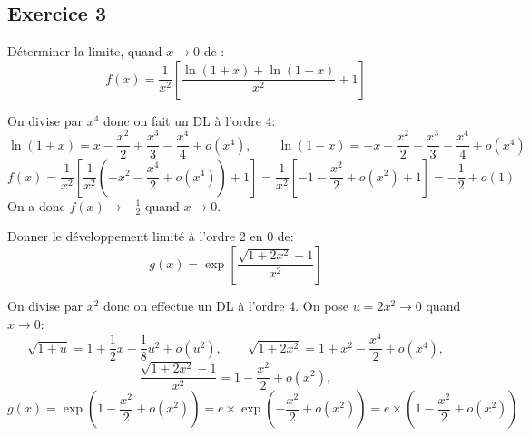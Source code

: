 \documentclass{article}[11pt]
\begin{document}
\subsection*{Exercice 3}
\begin{enumerate}
{\color{blue}
\item Déterminer la limite, quand $x\to 0$ de :
\[f(x)=\frac{1}{x^2}\left[\frac{\ln(1+x)+\ln(1-x)}{x^2}+1\right]\]}

On divise par $x^4$ donc on fait un DL à l'ordre 4:
\[\ln(1+x)=x-\frac{x^2}{2}+\frac{x^3}{3}-\frac{x^4}{4}+o(x^4),\qquad \ln(1-x)=-x-\frac{x^2}{2}-\frac{x^3}{3}-\frac{x^4}{4}+o(x^4)\]
\[f(x)=\frac{1}{x^2}\left[\frac{1}{x^2}\left(-x^2-\frac{x^4}{2}+o(x^4)\right)+1\right]=\frac{1}{x^2}\left[-1 -\frac{x^2}{2}+o(x^2)+1\right]=-\frac 12+o(1)\]
On a donc $f(x)\to -\frac 12$ quand $x\to 0$.
{\color{blue}
\item Donner le développement limité à l'ordre 2 en 0 de:
\[g(x)=\exp\left[\frac{\sqrt{1+2x^2}-1}{x^2}\right]\]}

On divise par $x^2$ donc on effectue un DL à l'ordre 4. On pose $u=2x^2\to 0$ quand $x\to 0$:
\[\sqrt{1+u}=1+\frac 12x-\frac 18u^2 +o(u^2), \qquad \sqrt{1+2x^2}=1+x^2-\frac {x^4}2 + o(x^4),\] 
\[\frac{\sqrt{1+2x^2}-1}{x^2}=1-\frac{x^2}{2}+o(x^2),\]
\[g(x)=\exp\left(1-\frac{x^2}{2}+o(x^2)\right)=e\times \exp\left(-\frac{x^2}{2}+o(x^2)\right)=e\times \left(1-\frac{x^2}{2}+o(x^2)\right)\]
\end{enumerate}
\end{document}
